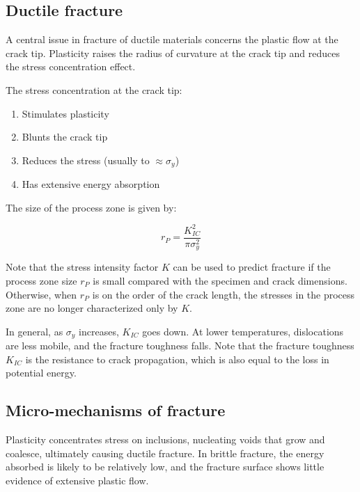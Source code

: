 \documentclass{article}
\begin{document}
\subsection{Ductile fracture}

A central issue in fracture of ductile materials concerns the plastic flow at the crack tip. Plasticity raises the radius of curvature at the crack tip and reduces the stress concentration effect.

The stress concentration at the crack tip:

\begin{enumerate}
    \item Stimulates plasticity
    \item Blunts the crack tip
    \item Reduces the stress (usually to $\approx \sigma_y$)
    \item Has extensive energy absorption
\end{enumerate}

\begin{proposition}
    The size of the process zone is given by:

    \[ r_P = \frac{K_{IC}^2}{\pi\sigma_y^2} \]

    Note that the stress intensity factor $K$ can be used to predict fracture if the process zone size $r_P$ is small compared with the specimen and crack dimensions. Otherwise, when $r_P$ is on the order of the crack length, the stresses in the process zone are no longer characterized only by $K$.
\end{proposition}

In general, as $\sigma_y$ increases, $K_{IC}$ goes down. At lower temperatures, dislocations are less mobile, and the fracture toughness falls. Note that the fracture toughness $K_{IC}$ is the resistance to crack propagation, which is also equal to the loss in potential energy.

\subsection{Micro-mechanisms of fracture}

\begin{proposition}
    Plasticity concentrates stress on inclusions, nucleating voids that grow and coalesce, ultimately causing ductile fracture.
    In brittle fracture, the energy absorbed is likely to be relatively low, and the fracture surface shows little evidence of extensive plastic flow.
\end{proposition}
\end{document}

